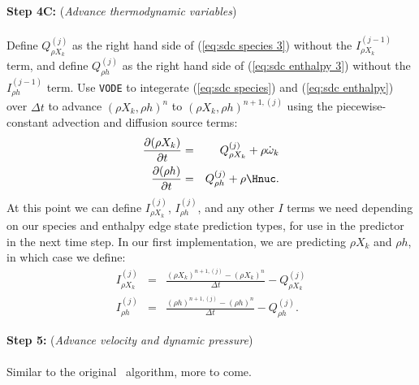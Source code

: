 {\bf Step 4C:} ({\it Advance thermodynamic variables})\\ \\
Define $Q_{\rho X_k}^{(j)}$ as the right hand side of (\ref{eq:sdc species 3}) without the $I_{\rho X_k}^{(j-1)}$ term, and define $Q_{\rho h}^{(j)}$ as the right hand side of (\ref{eq:sdc enthalpy 3}) without the $I_{\rho h}^{(j-1)}$ term.  Use {\tt VODE} to integerate (\ref{eq:sdc species}) and (\ref{eq:sdc enthalpy}) over $\Delta t$ to advance $(\rho X_k, \rho h)^n$ to $(\rho X_k, \rho h)^{n+1,(j)}$ using the piecewise-constant advection and diffusion source terms:
\begin{eqnarray}
\frac{\partial(\rho X_k)}{\partial t} &=& Q_{\rho X_k}^{(j)} + \rho\dot\omega_k\\
\frac{\partial(\rho h)}{\partial t} &=& Q_{\rho h}^{(j)} + \rho\Hnuc.
\end{eqnarray}
At this point we can define $I_{\rho X_k}^{(j)}$, $I_{\rho h}^{(j)}$, and any other $I$ terms we need depending on 
our species and enthalpy edge state prediction types, for use in the predictor in the next time step.  In our first implementation, we are predicting $\rho X_k$ and $\rho h$, in which case we define:
\begin{eqnarray}
I_{\rho X_k}^{(j)} &=& \frac{(\rho X_k)^{n+1,(j)} - (\rho X_k)^n}{\Delta t} - Q_{\rho X_k}^{(j)}\\
I_{\rho h}^{(j)} &=& \frac{(\rho h)^{n+1,(j)} - (\rho h)^n}{\Delta t} - Q_{\rho h}^{(j)}.
\end{eqnarray}

{\bf Step 5:} ({\it Advance velocity and dynamic pressure})\\ \\
Similar to the original \maestro\ algorithm, more to come.
